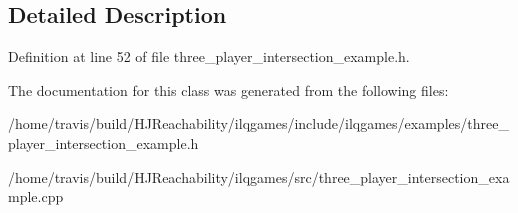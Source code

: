 \subsection{Detailed Description}


Definition at line 52 of file three\+\_\+player\+\_\+intersection\+\_\+example.\+h.



The documentation for this class was generated from the following files\+:\begin{DoxyCompactItemize}
\item 
/home/travis/build/\+H\+J\+Reachability/ilqgames/include/ilqgames/examples/three\+\_\+player\+\_\+intersection\+\_\+example.\+h\item 
/home/travis/build/\+H\+J\+Reachability/ilqgames/src/three\+\_\+player\+\_\+intersection\+\_\+example.\+cpp\end{DoxyCompactItemize}
